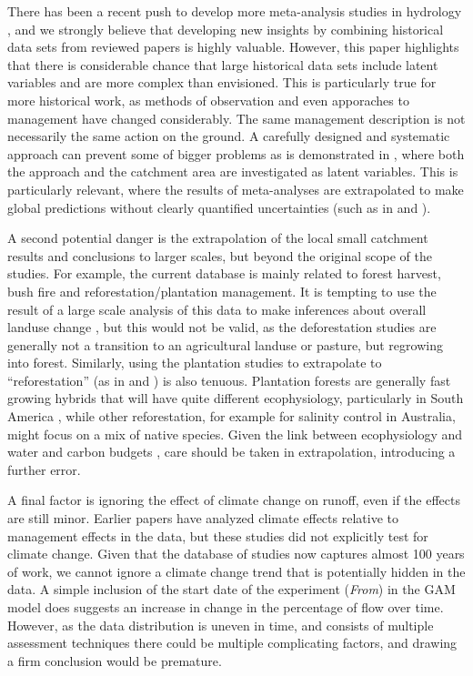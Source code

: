 \documentclass[]{elsarticle} %
\begin{document}
There has been a recent push to develop more meta-analysis studies in hydrology \citep{wang2020, evaristo2020metaanalysis}, and we strongly believe that developing new insights by combining historical data sets from reviewed papers is highly valuable. However, this paper highlights that there is considerable chance that large historical data sets include latent variables and are more complex than envisioned. This is particularly true for more historical work, as methods of observation and even apporaches to management have changed considerably. The same management description is not necessarily the same action on the ground. A carefully designed and systematic approach can prevent some of bigger problems as is demonstrated in \citet{wang2020}, where both the approach and the catchment area are investigated as latent variables.
This is particularly relevant, where the results of meta-analyses are extrapolated to make global predictions without clearly quantified uncertainties (such as in \citet{hoekvandijke2022} and \citet{wang2020}).

A second potential danger is the extrapolation of the local small catchment results and conclusions to larger scales, but beyond the original scope of the studies. For example, the current database is mainly related to forest harvest, bush fire and reforestation/plantation management. It is tempting to use the result of a large scale analysis of this data to make inferences about overall landuse change \citep{li2017, wang2020}, but this would not be valid, as the deforestation studies are generally not a transition to an agricultural landuse or pasture, but regrowing into forest. Similarly, using the plantation studies to extrapolate to ``reforestation'' (as in \citet{filoso2017} and \citet{hoekvandijke2022}) is also tenuous. Plantation forests are generally fast growing hybrids that will have quite different ecophysiology, particularly in South America \citep{jones2017, binkley2017}, while other reforestation, for example for salinity control in Australia, might focus on a mix of native species. Given the link between ecophysiology and water and carbon budgets \citep{jackson2005}, care should be taken in extrapolation, introducing a further error.

A final factor is ignoring the effect of climate change \citep{vervoort2021} on runoff, even if the effects are still minor. Earlier papers \citep{li2017, wang2020} have analyzed climate effects relative to management effects in the data, but these studies did not explicitly test for climate change. Given that the database of studies now captures almost 100 years of work, we cannot ignore a climate change trend that is potentially hidden in the data. A simple inclusion of the start date of the experiment (\emph{From}) in the GAM model does suggests an increase in change in the percentage of flow over time. However, as the data distribution is uneven in time, and consists of multiple assessment techniques there could be multiple complicating factors, and drawing a firm conclusion would be premature.
\end{document}
